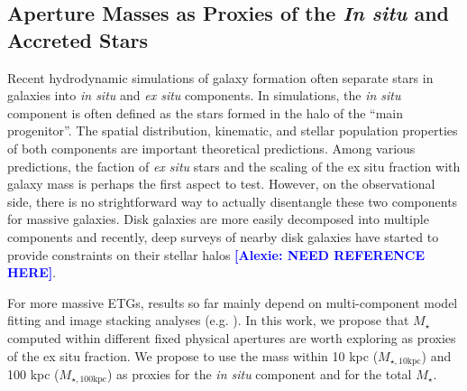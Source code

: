 \documentclass[a4paper,fleqn,usenatbib]{mnras}
\def\mstar{{$M_{\star}$}}
\def\minn{{$M_{\star,10\mathrm{kpc}}$}}
\def\mtot{{$M_{\star,100\mathrm{kpc}}$}}
\newcommand{\alexie}[1]{\textcolor{blue}{\textbf{[Alexie: #1]}}}
\begin{document}
    

\subsection{Aperture Masses as Proxies of the \textit{In situ} and Accreted Stars}
    \label{ssec:insitu}
    
    Recent hydrodynamic simulations of galaxy formation often separate stars in 
    galaxies into \textit{in situ} and \textit{ex situ} components. 
    In simulations, the \textit{in situ} component is often defined as the stars formed 
    in the halo of the ``main progenitor''.  
    The spatial distribution, kinematic, and stellar population properties of both 
    components are important theoretical predictions. Among various predictions,  the faction of  \textit{ex situ} stars and the scaling of the  ex situ fraction with galaxy mass is perhaps the  first aspect to test. However, on the observational side, there is no strightforward way to actually disentangle these two components for massive galaxies. Disk galaxies  are more easily decomposed into multiple components and recently, deep surveys of nearby disk galaxies have started to provide constraints on their stellar halos \alexie{NEED REFERENCE HERE}.
    
    For more massive ETGs,  results so far mainly depend on multi-component model fitting
    and image stacking analyses (e.g. \citealt{Huang2013a, DSouza2014, Spavone2017}).
    In this work, we propose that \mstar{} computed within different fixed physical apertures are worth exploring as  proxies of the  ex situ fraction. We propose to use the mass within 10 kpc (\minn{}) and 100 kpc (\mtot{}) as proxies for the \textit{in situ} component and for the total \mstar{}. 
    
\end{document}
